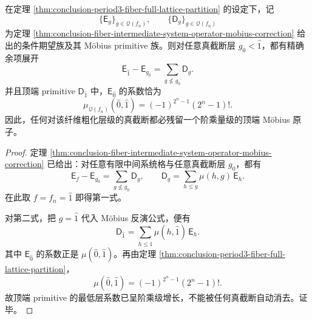 \begin{theorem}\label{thm:conclusion-period3-fiber-factorial-mobius-tail}
在定理 \ref{thm:conclusion-period3-fiber-full-lattice-partition} 的设定下，记
\[
\{\mathsf E_g\}_{g\in\mathcal Q(f_n)},
\qquad
\{\mathsf D_g\}_{g\in\mathcal Q(f_n)}
\]
为定理 \ref{thm:conclusion-fiber-intermediate-system-operator-mobius-correction} 给出的条件期望族及其 Möbius primitive 族。则对任意真截断层 \(g_0<\hat1\)，都有精确余项展开
\[
\mathsf E_{\hat1}-\mathsf E_{g_0}
=
\sum_{g\not\le g_0}\mathsf D_g.
\]
并且顶端 primitive \(\mathsf D_{\hat1}\) 中，\(\mathsf E_{\hat0}\) 的系数恰为
\[
\mu_{\mathcal Q(f_n)}(\hat0,\hat1)=(-1)^{2^n-1}(2^n-1)!.
\]
因此，任何对该纤维粗化层级的真截断都必残留一个阶乘量级的顶端 Möbius 原子。
\end{theorem}
\begin{proof}
定理 \ref{thm:conclusion-fiber-intermediate-system-operator-mobius-correction} 已给出：对任意有限中间系统格与任意真截断层 \(g_0\)，都有
\[
\mathsf E_f-\mathsf E_{g_0}=\sum_{g\not\le g_0}\mathsf D_g,
\qquad
\mathsf D_g=\sum_{h\le g}\mu(h,g)\,\mathsf E_h.
\]
在此取 \(f=f_n=\hat1\) 即得第一式。

对第二式，把 \(g=\hat1\) 代入 Möbius 反演公式，便有
\[
\mathsf D_{\hat1}=\sum_{h\le \hat1}\mu(h,\hat1)\,\mathsf E_h.
\]
其中 \(\mathsf E_{\hat0}\) 的系数正是 \(\mu(\hat0,\hat1)\)。再由定理 \ref{thm:conclusion-period3-fiber-full-lattice-partition}，
\[
\mu(\hat0,\hat1)=(-1)^{2^n-1}(2^n-1)!.
\]
故顶端 primitive 的最低层系数已呈阶乘级增长，不能被任何真截断自动消去。证毕。
\end{proof}

